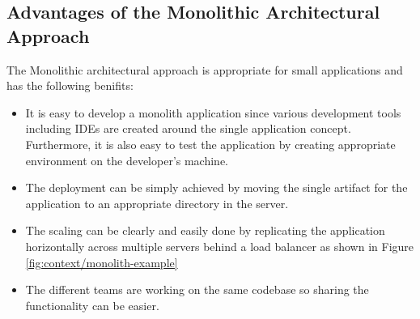 \begin{enumerate}
\subsection{Advantages of the Monolithic Architectural Approach}\label{subsection:context/monolith-advantages}
The Monolithic architectural approach is appropriate for small applications and has the following benifits:\cite{Richardson:2014ab}\cite{Fowler:2014aa}\cite{Gupta:2015aa}\cite{Abram:2014aa}
\begin{itemize}[leftmargin=.5in]
\item It is easy to develop a monolith application since various development tools including \acrshort{IDE}s are created around the single application concept. Furthermore, it is also easy to test the application by creating appropriate environment on the developer's machine.
\item The deployment can be simply achieved by moving the single artifact for the application to an appropriate directory in the server.
\item The scaling can be clearly and easily done by replicating the application horizontally across multiple servers behind a load balancer as shown in Figure \ref{fig:context/monolith-example}
\item The different teams are working on the same codebase so sharing the functionality can be easier.
\end{itemize}
\\

\end{enumerate}
